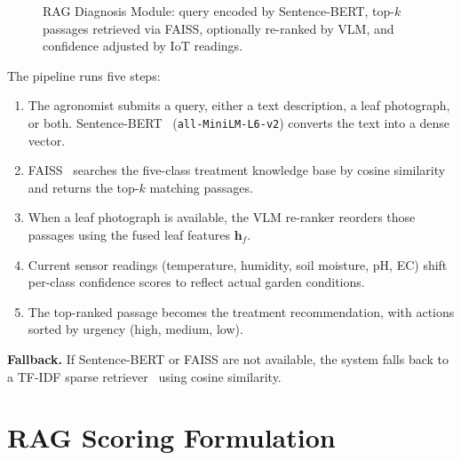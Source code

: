 \documentclass[12pt, a4paper, oneside]{Thesis}
\begin{document}
\begin{figure}[t]
\caption{RAG Diagnosis Module: query encoded by Sentence-BERT, top-$k$ passages retrieved via FAISS, optionally re-ranked by VLM, and confidence adjusted by IoT readings.}
\label{fig:ragpipeline}
\end{figure}

The pipeline runs five steps:
\begin{enumerate}
  \item The agronomist submits a query, either a text description, a leaf photograph,
        or both. Sentence-BERT~\cite{Reimers2019} (\texttt{all-MiniLM-L6-v2}) converts
        the text into a dense vector.
  \item FAISS~\cite{Johnson2019} searches the five-class treatment knowledge base by
        cosine similarity and returns the top-$k$ matching passages.
  \item When a leaf photograph is available, the VLM re-ranker reorders those passages
        using the fused leaf features $\mathbf{h}_f$.
  \item Current sensor readings (temperature, humidity, soil moisture, pH, EC) shift
        per-class confidence scores to reflect actual garden conditions.
  \item The top-ranked passage becomes the treatment recommendation, with actions
        sorted by urgency (high, medium, low).
\end{enumerate}

\textbf{Fallback.} If Sentence-BERT or FAISS are not available, the system falls
back to a TF-IDF sparse retriever~\cite{Robertson1994} using cosine similarity.

\section{RAG Scoring Formulation}
\end{document}
